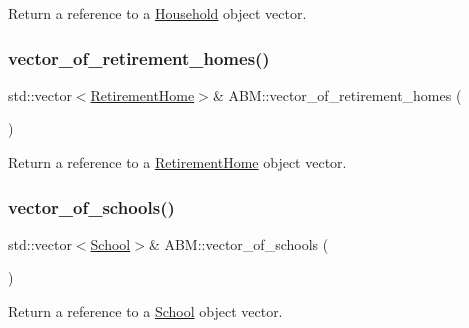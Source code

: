 Return a reference to a \hyperlink{classHousehold}{Household} object vector. 

\mbox{\label{classABM_a8bcde147b1d1fbb81edcc0e9f7c717ae}} 
\subsubsection{\texorpdfstring{vector\+\_\+of\+\_\+retirement\+\_\+homes()}{vector\_of\_retirement\_homes()}}
{\footnotesize\ttfamily std\+::vector$<$\hyperlink{classRetirementHome}{Retirement\+Home}$>$\& A\+B\+M\+::vector\+\_\+of\+\_\+retirement\+\_\+homes (\begin{DoxyParamCaption}{ }\end{DoxyParamCaption})\hspace{0.3cm}{\ttfamily [inline]}}



Return a reference to a \hyperlink{classRetirementHome}{Retirement\+Home} object vector. 

\mbox{\label{classABM_a2a30709478a547ede2207ffd51070fff}} 
\subsubsection{\texorpdfstring{vector\+\_\+of\+\_\+schools()}{vector\_of\_schools()}}
{\footnotesize\ttfamily std\+::vector$<$\hyperlink{classSchool}{School}$>$\& A\+B\+M\+::vector\+\_\+of\+\_\+schools (\begin{DoxyParamCaption}{ }\end{DoxyParamCaption})\hspace{0.3cm}{\ttfamily [inline]}}



Return a reference to a \hyperlink{classSchool}{School} object vector. 

\mbox{\label{classABM_a3ae1ff992b82308e3b1ea5a0372f4d96}} 
